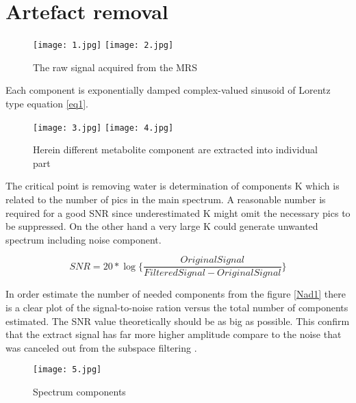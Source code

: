\section{Artefact removal}




\begin{figure}[!htbp]
%
\centering
\texttt{[image: 1.jpg]}
\label{1}
\endminipage\hfill
{}%
\centering
\texttt{[image: 2.jpg]}
\label{2}
\endminipage\hfill
\caption{The raw signal acquired from the MRS}
\end{figure}

 
Each component is exponentially damped complex-valued sinusoid of Lorentz type equation \ref{eq1}.


\begin{figure}[!htbp]
%
\centering
\texttt{[image: 3.jpg]}
\label{3}
\endminipage\hfill
{}%
\centering
\texttt{[image: 4.jpg]}
\label{4}
\endminipage\hfill
\caption{Herein different metabolite component are extracted into individual part}
\end{figure}

The critical point is removing water is determination of components K which is related to the number of pics in the main spectrum. A reasonable number is required for a good SNR since underestimated K might omit the necessary pics to be suppressed. On the other hand a very large K could generate unwanted spectrum including noise component\cite{1}. 

\begin{equation}
SNR=20*\log\bigg\{\frac{OriginalSignal}{FilteredSignal-OriginalSignal}\bigg\}
\end{equation} 

In order estimate the number of needed components from the figure \ref{Nad1} there is a clear plot of the signal-to-noise ration versus the total number of components estimated. The SNR value theoretically should be as big as possible. This confirm that the extract signal has far more higher amplitude compare to the noise that was canceled out from the subspace filtering \cite{1}.

\begin{figure}[!htbp]
\centering
\texttt{[image: 5.jpg]}
\caption{Spectrum components}\label{fig1}
\end{figure}

